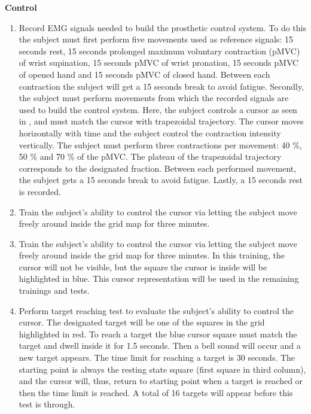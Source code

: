 \textbf{{Control}} \\
\vspace{-25pt}
\begin{enumerate}
	\item Record EMG signals needed to build the prosthetic control system. To do this the subject must first perform  five movements used as reference signals: 15 seconds rest, 15 seconds prolonged maximum voluntary contraction (pMVC) of wrist supination, 15 seconds pMVC of wrist pronation, 15 seconds pMVC of opened hand and 15 seconds pMVC of closed hand. Between each contraction the subject will get a 15 seconds break to avoid fatigue. Secondly, the subject must perform movements from which the recorded signals are used to build the control system. Here, the subject controls a cursor as seen in , and must match the cursor with trapezoidal trajectory. The cursor moves horizontally with time and the subject control the contraction intensity vertically. The subject must perform three contractions per movement: 40 \%, 50 \% and 70 \% of the pMVC. The plateau of the trapezoidal trajectory corresponds to the designated fraction. Between each performed movement, the subject gets a 15 seconds break to avoid fatigue. Lastly, a 15 seconds rest is recorded. 
	\item Train the subject's ability to control the cursor via letting the subject move freely around inside the grid map for three minutes.
	\item Train the subject's ability to control the cursor via letting the subject move freely around inside the grid map for three minutes. In this training, the cursor will not be visible, but the square the cursor is inside will be highlighted in blue. This cursor representation will be used in the remaining trainings and tests.
	\item Perform target reaching test to evaluate the subject's ability to control the cursor. The designated target will be one of the squares in the grid highlighted in red. To reach a target the blue cursor square must match the target and dwell inside it for 1.5 seconds. Then a bell sound will occur and a new target appears. The time limit for reaching a target is 30 seconds. The starting point is always the resting state square (first square in third column), and the cursor will, thus, return to starting point when a target is reached or then the time limit is reached. A total of 16 targets will appear before this test is through.
\end{enumerate}

